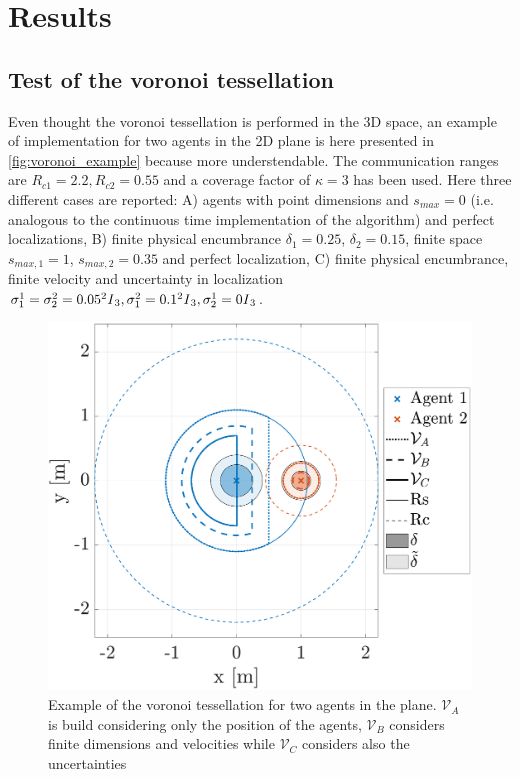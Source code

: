 \section{Results}
\subsection{Test of the voronoi tessellation}
Even thought the voronoi tessellation is performed in the 3D space, an example of implementation for two agents in the 2D plane is here presented in \autoref{fig:voronoi_example} because more understendable. The communication ranges are $R_{c1}=2.2, R_{c2}=0.55$ and a coverage factor of $\kappa=3$ has been used.  Here three different cases are reported: A) agents with point dimensions and $s_{max}=0$ (i.e. analogous to the continuous time implementation of the algorithm) and perfect localizations, B) finite physical encumbrance $\delta_1=0.25$, $\delta_2=0.15$, finite space $s_{max,1}=1$, $s_{max,2}=0.35$ and perfect localization, C) finite physical encumbrance, finite velocity and uncertainty in localization $\sigma_{1}^1=\sigma_{2}^2=0.05^2 \text{\textit{I}}_3, \sigma_{1}^2=0.1^2 \text{\textit{I}}_3, \sigma_{2}^1=0 \text{\textit{I}}_3$.
\begin{figure}[htb]
\centering
    \includegraphics[width=0.7\columnwidth]{images/fig_voronoi_example.eps}
    \caption{Example of the voronoi tessellation for two agents in the plane. $\mathcal{V}_A$ is build considering only the position of the agents, $\mathcal{V}_B$ considers finite dimensions and velocities while $\mathcal{V}_C$ considers also the uncertainties }
    \label{fig:voronoi_example}
\end{figure}
